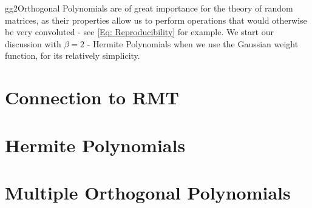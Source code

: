 gg2Orthogonal Polynomials are of great importance for the theory of random matrices, as their properties allow us to perform operations that would otherwise be very convoluted - see \eqref{Eq: Reproducibility} for example. We start our discussion with $\beta = 2$ - Hermite Polynomials when we use the Gaussian weight function, for its relatively simplicity.

\section{Connection to RMT}



\section{Hermite Polynomials}



\section{Multiple Orthogonal Polynomials}



